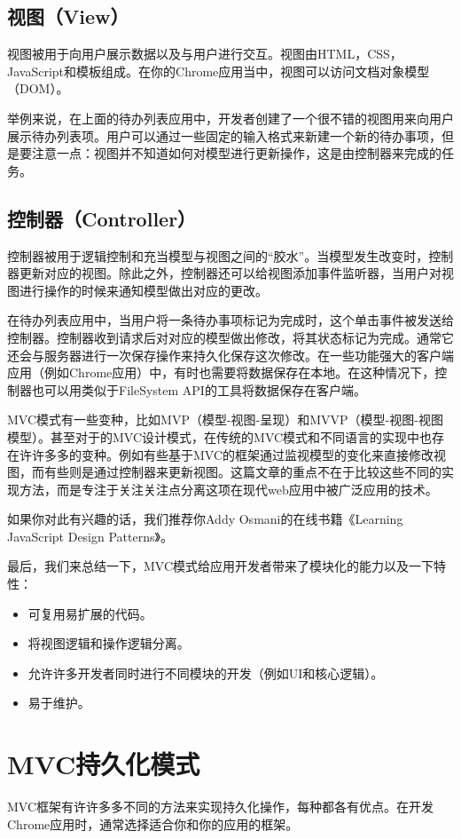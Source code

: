 \subsection{视图（View）}
视图被用于向用户展示数据以及与用户进行交互。视图由HTML，CSS，JavaScript和模板组成。在你的Chrome应用当中，视图可以访问文档对象模型（DOM）。

举例来说，在上面的待办列表应用中，开发者创建了一个很不错的视图用来向用户展示待办列表项。用户可以通过一些固定的输入格式来新建一个新的待办事项，但是要注意一点：视图并不知道如何对模型进行更新操作，这是由控制器来完成的任务。


\subsection{控制器（Controller）}
控制器被用于逻辑控制和充当模型与视图之间的``胶水''。当模型发生改变时，控制器更新对应的视图。除此之外，控制器还可以给视图添加事件监听器，当用户对视图进行操作的时候来通知模型做出对应的更改。

在待办列表应用中，当用户将一条待办事项标记为完成时，这个单击事件被发送给控制器。控制器收到请求后对对应的模型做出修改，将其状态标记为完成。通常它还会与服务器进行一次保存操作来持久化保存这次修改。在一些功能强大的客户端应用（例如Chrome应用）中，有时也需要将数据保存在本地。在这种情况下，控制器也可以用类似于FileSystem API的工具将数据保存在客户端。

MVC模式有一些变种，比如MVP（模型-视图-呈现）和MVVP（模型-视图-视图模型）。甚至对于的MVC设计模式，在传统的MVC模式和不同语言的实现中也存在许许多多的变种。例如有些基于MVC的框架通过监视模型的变化来直接修改视图，而有些则是通过控制器来更新视图。这篇文章的重点不在于比较这些不同的实现方法，而是专注于关注关注点分离这项在现代web应用中被广泛应用的技术。

如果你对此有兴趣的话，我们推荐你Addy Osmani的在线书籍《Learning JavaScript Design Patterns》。

最后，我们来总结一下，MVC模式给应用开发者带来了模块化的能力以及一下特性：
\begin{itemize}
  \item 可复用易扩展的代码。
  \item 将视图逻辑和操作逻辑分离。
  \item 允许许多开发者同时进行不同模块的开发（例如UI和核心逻辑）。
  \item 易于维护。
\end{itemize}


\section{MVC持久化模式}
MVC框架有许许多多不同的方法来实现持久化操作，每种都各有优点。在开发Chrome应用时，通常选择适合你和你的应用的框架。

